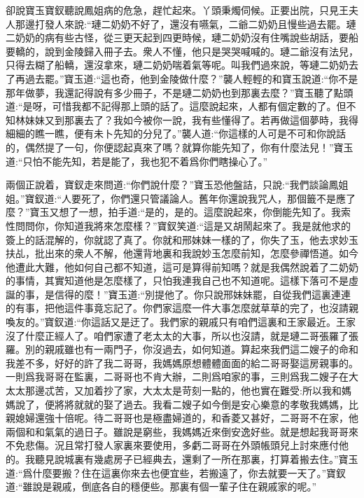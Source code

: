 


\begin{parag}
    卻說寶玉寶釵聽說鳳姐病的危急，趕忙起來。丫頭秉燭伺候。正要出院，只見王夫人那邊打發人來說:“璉二奶奶不好了，還沒有嚥氣，二爺二奶奶且慢些過去罷。璉二奶奶的病有些古怪，從三更天起到四更時候，璉二奶奶沒有住嘴說些胡話，要船要轎的，說到金陵歸入冊子去。衆人不懂，他只是哭哭喊喊的。璉二爺沒有法兒，只得去糊了船轎，還沒拿來，璉二奶奶喘着氣等呢。叫我們過來說，等璉二奶奶去了再過去罷。”寶玉道:“這也奇，他到金陵做什麼？”襲人輕輕的和寶玉說道:“你不是那年做夢，我還記得說有多少冊子，不是璉二奶奶也到那裏去麼？”寶玉聽了點頭道:“是呀，可惜我都不記得那上頭的話了。這麼說起來，人都有個定數的了。但不知林妹妹又到那裏去了？我如今被你一說，我有些懂得了。若再做這個夢時，我得細細的瞧一瞧，便有未卜先知的分兒了。”襲人道:“你這樣的人可是不可和你說話的，偶然提了一句，你便認起真來了嗎？就算你能先知了，你有什麼法兒！”寶玉道:“只怕不能先知，若是能了，我也犯不着爲你們瞎操心了。”
\end{parag}


\begin{parag}
    兩個正說着，寶釵走來問道:“你們說什麼？”寶玉恐他盤詰，只說:“我們談論鳳姐姐。”寶釵道:“人要死了，你們還只管議論人。舊年你還說我咒人，那個籤不是應了麼？”寶玉又想了一想，拍手道:“是的，是的。這麼說起來，你倒能先知了。我索性問問你，你知道我將來怎麼樣？”寶釵笑道:“這是又胡鬧起來了。我是就他求的簽上的話混解的，你就認了真了。你就和邢妹妹一樣的了，你失了玉，他去求妙玉扶乩，批出來的衆人不解，他還背地裏和我說妙玉怎麼前知，怎麼參禪悟道。如今他遭此大難，他如何自己都不知道，這可是算得前知嗎？就是我偶然說着了二奶奶的事情，其實知道他是怎麼樣了，只怕我連我自己也不知道呢。這樣下落可不是虛誕的事，是信得的麼！”寶玉道:“別提他了。你只說邢妹妹罷，自從我們這裏連連的有事，把他這件事竟忘記了。你們家這麼一件大事怎麼就草草的完了，也沒請親喚友的。”寶釵道:“你這話又是迂了。我們家的親戚只有咱們這裏和王家最近。王家沒了什麼正經人了。咱們家遭了老太太的大事，所以也沒請，就是璉二哥張羅了張羅。別的親戚雖也有一兩門子，你沒過去，如何知道。算起來我們這二嫂子的命和我差不多，好好的許了我二哥哥，我媽媽原想體體面面的給二哥哥娶這房親事的。一則爲我哥哥在監裏，二哥哥也不肯大辦，二則爲咱家的事，三則爲我二嫂子在大太太那邊忒苦，又加着抄了家，大太太是苛刻一點的，他也實在難受:所以我和媽媽說了，便將將就就的娶了過去。我看二嫂子如今倒是安心樂意的孝敬我媽媽，比親媳婦還強十倍呢。待二哥哥也是極盡婦道的，和香菱又甚好，二哥哥不在家，他兩個和和氣氣的過日子。雖說是窮些，我媽媽近來倒安逸好些。就是想起我哥哥來不免悲傷。況且常打發人家裏來要使用，多虧二哥哥在外頭帳頭兒上討來應付他的。我聽見說城裏有幾處房子已經典去，還剩了一所在那裏，打算着搬去住。”寶玉道:“爲什麼要搬？住在這裏你來去也便宜些，若搬遠了，你去就要一天了。”寶釵道:“雖說是親戚，倒底各自的穩便些。那裏有個一輩子住在親戚家的呢。”
\end{parag}


